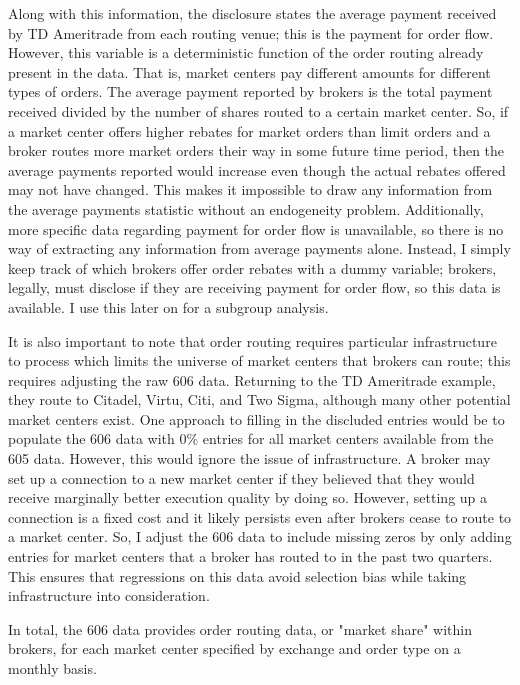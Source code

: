 \documentclass[12pt,a4paper]{article}
\begin{document}
		Along with this information, the disclosure states the average payment received by TD Ameritrade from each routing venue; this is the payment for order flow. However, this variable is a deterministic function of the order routing already present in the data. That is, market centers pay different amounts for different types of orders. The average payment reported by brokers is the total payment received divided by the number of shares routed to a certain market center. So, if a market center offers higher rebates for market orders than limit orders and a broker routes more market orders their way in some future time period, then the average payments reported would increase even though the actual rebates offered may not have changed. This makes it impossible to draw any information from the average payments statistic without an endogeneity problem. Additionally, more specific data regarding payment for order flow is unavailable, so there is no way of extracting any information from average payments alone. Instead, I simply keep track of which brokers offer order rebates with a dummy variable; brokers, legally, must disclose if they are receiving payment for order flow, so this data is available. I use this later on for a subgroup analysis. 
		
		It is also important to note that order routing requires particular infrastructure to process which limits the universe of market centers that brokers can route; this requires adjusting the raw 606 data. Returning to the TD Ameritrade example, they route to Citadel, Virtu, Citi, and Two Sigma, although many other potential market centers exist. One approach to filling in the discluded entries would be to populate the 606 data with 0\% entries for all market centers available from the 605 data. However, this would ignore the issue of infrastructure. A broker may set up a connection to a new market center if they believed that they would receive marginally better execution quality by doing so. However, setting up a connection is a fixed cost and it likely persists even after brokers cease to route to a market center. So, I adjust the 606 data to include missing zeros by only adding entries for market centers that a broker has routed to in the past two quarters. This ensures that regressions on this data avoid selection bias while taking infrastructure into consideration. 
		
		In total, the 606 data provides order routing data, or "market share" within brokers, for each market center specified by exchange and order type on a monthly basis. 
	
\end{document}
